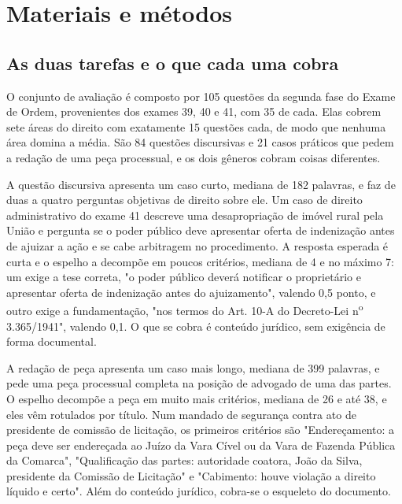 \documentclass{IOS-Book-Article}
\begin{document}
\section{Materiais e métodos}

\subsection{As duas tarefas e o que cada uma cobra}

O conjunto de avaliação é composto por 105 questões da segunda fase do Exame de Ordem, provenientes dos exames 39, 40 e 41, com 35 de cada. Elas cobrem sete áreas do direito com exatamente 15 questões cada, de modo que nenhuma área domina a média. São 84 questões discursivas e 21 casos práticos que pedem a redação de uma peça processual, e os dois gêneros cobram coisas diferentes.

A questão discursiva apresenta um caso curto, mediana de 182 palavras, e faz de duas a quatro perguntas objetivas de direito sobre ele. Um caso de direito administrativo do exame 41 descreve uma desapropriação de imóvel rural pela União e pergunta se o poder público deve apresentar oferta de indenização antes de ajuizar a ação e se cabe arbitragem no procedimento. A resposta esperada é curta e o espelho a decompõe em poucos critérios, mediana de 4 e no máximo 7: um exige a tese correta, "o poder público deverá notificar o proprietário e apresentar oferta de indenização antes do ajuizamento", valendo 0,5 ponto, e outro exige a fundamentação, "nos termos do Art. 10-A do Decreto-Lei n\textsuperscript{o} 3.365/1941", valendo 0,1. O que se cobra é conteúdo jurídico, sem exigência de forma documental.

A redação de peça apresenta um caso mais longo, mediana de 399 palavras, e pede uma peça processual completa na posição de advogado de uma das partes. O espelho decompõe a peça em muito mais critérios, mediana de 26 e até 38, e eles vêm rotulados por título. Num mandado de segurança contra ato de presidente de comissão de licitação, os primeiros critérios são "Endereçamento: a peça deve ser endereçada ao Juízo da Vara Cível ou da Vara de Fazenda Pública da Comarca", "Qualificação das partes: autoridade coatora, João da Silva, presidente da Comissão de Licitação" e "Cabimento: houve violação a direito líquido e certo". Além do conteúdo jurídico, cobra-se o esqueleto do documento.
\end{document}
